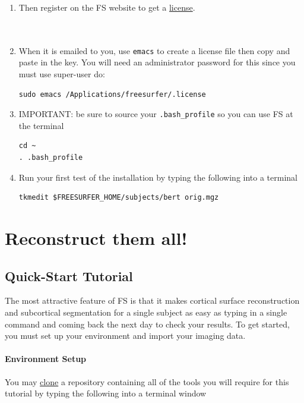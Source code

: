 \documentclass[paper=a4, fontsize=11pt]{scrartcl} %
\numberwithin{equation}{section} %
\numberwithin{figure}{section} %
\numberwithin{table}{section} %
\begin{document}
\begin{enumerate}
\item Then register on the FS website to get a \href{https://surfer.nmr.mgh.harvard.edu/registration.html}{license}.
\\~ \\~
\item When it is emailed to you, use \texttt{emacs} to create a license file then copy and paste in the key. You will need an administrator password for this since you must use super-user do:
\begin{lstlisting}[frame=single]
sudo emacs /Applications/freesurfer/.license
\end{lstlisting}  

\item IMPORTANT: be sure to source your \texttt{.bash\_profile} so you can use FS at the terminal
\begin{lstlisting}[frame=single]
cd ~
. .bash_profile
\end{lstlisting}
\item Run your first test of the installation by typing the following into a terminal
\begin{lstlisting}[frame=single]
tkmedit $FREESURFER_HOME/subjects/bert orig.mgz
\end{lstlisting}
\end{enumerate}

\section{Reconstruct them all!}
\subsection{Quick-Start Tutorial} The most attractive feature of  FS is that it makes cortical surface reconstruction and subcortical segmentation for a single subject as easy as typing in a single command and coming back the next day to check your results.  To get started, you must set up your environment and import your imaging data.
\paragraph{Environment Setup}You may \href{http://stackoverflow.com/questions/2916849/what-do-these-words-mean-in-git-repository-fork-branch-clone-track}{clone} a repository containing all of the tools you will require for this tutorial by typing the following into a terminal window
\end{document}
